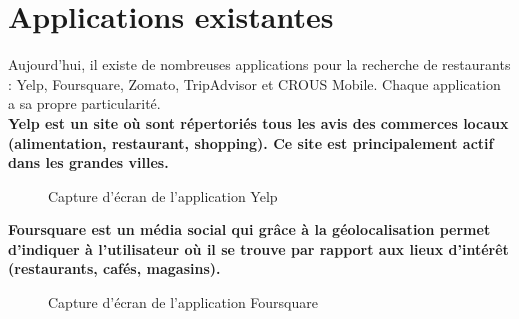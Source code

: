 
\section{Applications existantes}

Aujourd'hui, il existe de nombreuses applications pour la recherche de restaurants : Yelp, Foursquare, Zomato, TripAdvisor et CROUS Mobile. Chaque application a sa propre particularité. \\

\bf{Yelp} est un site où sont répertoriés tous les avis des commerces locaux (alimentation, restaurant, shopping). Ce site est principalement actif dans les grandes villes.

\begin{figure}[H]
    \label{fig-yelp}
    \noindent{}
    \caption{Capture d'écran de l'application Yelp}
\end{figure}

\bf{Foursquare} est un média social qui grâce à la géolocalisation permet d'indiquer à l'utilisateur  où il se trouve par rapport aux lieux d'intérêt (restaurants, cafés, magasins).

\begin{figure}[H]
    \label{fig-foursquare}
    \noindent{}
    \caption{Capture d'écran de l'application Foursquare}
\end{figure}


